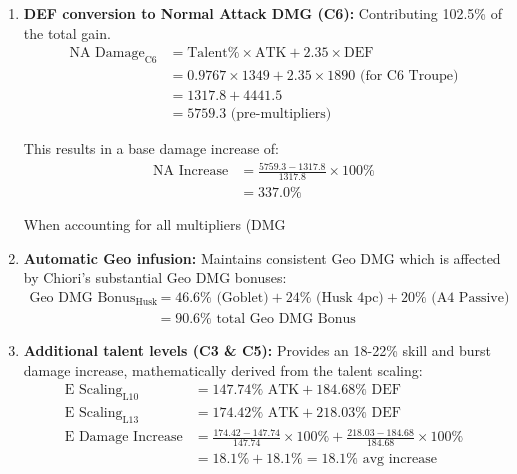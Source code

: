 \documentclass[12pt,a4paper]{article}
\begin{document}
\begin{enumerate}
    \item \textbf{DEF conversion to Normal Attack DMG (C6):} Contributing 102.5\% of the total gain.
        \begin{align}
        \text{NA Damage}_{\text{C6}} &= \text{Talent\%} \times \text{ATK} + 2.35 \times \text{DEF} \\
        &= 0.9767 \times 1349 + 2.35 \times 1890 \text{ (for C6 Troupe)} \\
        &= 1317.8 + 4441.5 \\
        &= 5759.3 \text{ (pre-multipliers)}
        \end{align}
        
        This results in a base damage increase of:
        \begin{align}
        \text{NA Increase} &= \frac{5759.3 - 1317.8}{1317.8} \times 100\% \\
        &= 337.0\%
        \end{align}
        
        When accounting for all multipliers (DMG%
    
    \item \textbf{Automatic Geo infusion:} Maintains consistent Geo DMG which is affected by Chiori's substantial Geo DMG bonuses:
        \begin{align}
        \text{Geo DMG Bonus}_{\text{Husk}} &= 46.6\% \text{ (Goblet)} + 24\% \text{ (Husk 4pc)} + 20\% \text{ (A4 Passive)} \\
        &= 90.6\% \text{ total Geo DMG Bonus}
        \end{align}
    
    \item \textbf{Additional talent levels (C3 \& C5):} Provides an 18-22\% skill and burst damage increase, mathematically derived from the talent scaling:
        \begin{align}
        \text{E Scaling}_{\text{L10}} &= 147.74\% \text{ ATK} + 184.68\% \text{ DEF} \\
        \text{E Scaling}_{\text{L13}} &= 174.42\% \text{ ATK} + 218.03\% \text{ DEF} \\
        \text{E Damage Increase} &= \frac{174.42 - 147.74}{147.74} \times 100\% + \frac{218.03 - 184.68}{184.68} \times 100\% \\
        &= 18.1\% + 18.1\% = 18.1\% \text{ avg increase}
        \end{align}
        

\end{enumerate}
\end{document}
